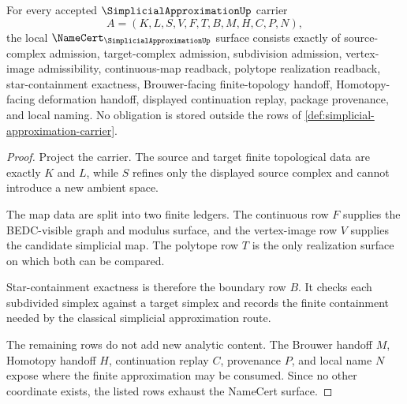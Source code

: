 \begin{theorem}
\label{thm:simplicial-approximation-namecert-obligations}
For every accepted $\SimplicialApproximationUp$ carrier
$$
A=(K,L,S,V,F,T,B,M,H,C,P,N),
$$
the local $\NameCert_{\SimplicialApproximationUp}$ surface consists exactly of source-complex admission, target-complex admission, subdivision admission, vertex-image admissibility, continuous-map readback, polytope realization readback, star-containment exactness, Brouwer-facing finite-topology handoff, Homotopy-facing deformation handoff, displayed continuation replay, package provenance, and local naming. No obligation is stored outside the rows of \autoref{def:simplicial-approximation-carrier}.
\end{theorem}
\begin{proof}
Project the carrier. The source and target finite topological data are exactly $K$ and $L$, while $S$ refines only the displayed source complex and cannot introduce a new ambient space.

The map data are split into two finite ledgers. The continuous row $F$ supplies the BEDC-visible graph and modulus surface, and the vertex-image row $V$ supplies the candidate simplicial map. The polytope row $T$ is the only realization surface on which both can be compared.

Star-containment exactness is therefore the boundary row $B$. It checks each subdivided simplex against a target simplex and records the finite containment needed by the classical simplicial approximation route.

The remaining rows do not add new analytic content. The Brouwer handoff $M$, Homotopy handoff $H$, continuation replay $C$, provenance $P$, and local name $N$ expose where the finite approximation may be consumed. Since no other coordinate exists, the listed rows exhaust the NameCert surface.
\end{proof}

